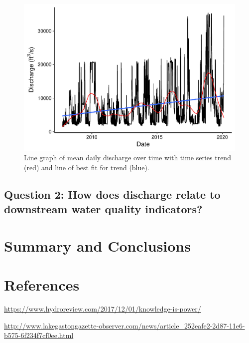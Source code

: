 \documentclass[12pt,]{article}
\begin{document}
\begin{figure}
\centering
\includegraphics{Project_Template_files/figure-latex/unnamed-chunk-7-1.pdf}
\caption{Line graph of mean daily discharge over time with time series
trend (red) and line of best fit for trend (blue).}
\end{figure}

\hypertarget{question-2-how-does-discharge-relate-to-downstream-water-quality-indicators}{%
\subsection{Question 2: How does discharge relate to downstream water
quality
indicators?}\label{question-2-how-does-discharge-relate-to-downstream-water-quality-indicators}}

\newpage

\hypertarget{summary-and-conclusions}{%
\section{Summary and Conclusions}\label{summary-and-conclusions}}

\newpage

\hypertarget{references}{%
\section{References}\label{references}}

\url{https://www.hydroreview.com/2017/12/01/knowledge-is-power/}

\url{http://www.lakegastongazette-observer.com/news/article_252eafe2-2d87-11e6-b575-6f234f7cf0ee.html}
\end{document}
